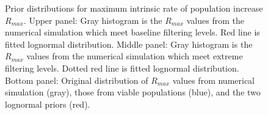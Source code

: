 \documentclass[
  11pt,
]{SCreport}
\begin{document}
\newpage

\begin{figure}[H]


\caption{\label{fig-rmax-prior}Prior distributions for maximum intrinsic
rate of population increase \(R_{max}\). Upper panel: Gray histogram is
the \(R_{max}\) values from the numerical simulation which meet baseline
filtering levels. Red line is fitted lognormal distribution. Middle
panel: Gray histogram is the \(R_{max}\) values from the numerical
simulation which meet extreme filtering levels. Dotted red line is
fitted lognormal distribution. Bottom panel: Original distribution of
\(R_{max}\) values from numerical simulation (gray), those from viable
populations (blue), and the two lognormal priors (red).}

\end{figure}%

\newpage
\end{document}
